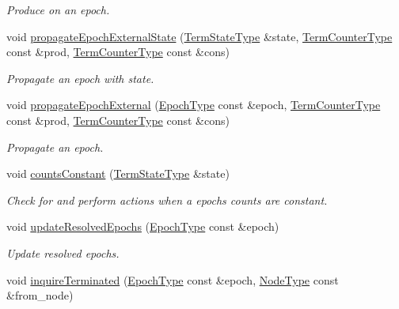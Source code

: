 \begin{DoxyCompactItemize}
\begin{DoxyCompactList}\small\item\em Produce on an epoch. \end{DoxyCompactList}\item 
void \hyperlink{structvt_1_1term_1_1_termination_detector_a233dc0ec4468f6e8006c959d613c28fd}{propagate\+Epoch\+External\+State} (\hyperlink{structvt_1_1term_1_1_term_action_ae4c635b69751d887666814700ed64d65}{Term\+State\+Type} \&state, \hyperlink{namespacevt_1_1term_a4fd378cdb0c36683afc1b3399d685f7f}{Term\+Counter\+Type} const \&prod, \hyperlink{namespacevt_1_1term_a4fd378cdb0c36683afc1b3399d685f7f}{Term\+Counter\+Type} const \&cons)
\begin{DoxyCompactList}\small\item\em Propagate an epoch with state. \end{DoxyCompactList}\item 
void \hyperlink{structvt_1_1term_1_1_termination_detector_a580b7ba3727a7358125cf217e9dcab19}{propagate\+Epoch\+External} (\hyperlink{namespacevt_a81d11b28122d43bf9834577e4a06440f}{Epoch\+Type} const \&epoch, \hyperlink{namespacevt_1_1term_a4fd378cdb0c36683afc1b3399d685f7f}{Term\+Counter\+Type} const \&prod, \hyperlink{namespacevt_1_1term_a4fd378cdb0c36683afc1b3399d685f7f}{Term\+Counter\+Type} const \&cons)
\begin{DoxyCompactList}\small\item\em Propagate an epoch. \end{DoxyCompactList}\item 
void \hyperlink{structvt_1_1term_1_1_termination_detector_a9460b5236e34a5baa344b0ac814ce3c9}{counts\+Constant} (\hyperlink{structvt_1_1term_1_1_term_action_ae4c635b69751d887666814700ed64d65}{Term\+State\+Type} \&state)
\begin{DoxyCompactList}\small\item\em Check for and perform actions when a epoch\textquotesingle{}s counts are constant. \end{DoxyCompactList}\item 
void \hyperlink{structvt_1_1term_1_1_termination_detector_a7637035e3f3c0f898d8dc79bbc2d8bf4}{update\+Resolved\+Epochs} (\hyperlink{namespacevt_a81d11b28122d43bf9834577e4a06440f}{Epoch\+Type} const \&epoch)
\begin{DoxyCompactList}\small\item\em Update resolved epochs. \end{DoxyCompactList}\item 
void \hyperlink{structvt_1_1term_1_1_termination_detector_a8a6c9a639b67a774e15c98d4b9d80166}{inquire\+Terminated} (\hyperlink{namespacevt_a81d11b28122d43bf9834577e4a06440f}{Epoch\+Type} const \&epoch, \hyperlink{namespacevt_a866da9d0efc19c0a1ce79e9e492f47e2}{Node\+Type} const \&from\+\_\+node)

\end{DoxyCompactItemize}
